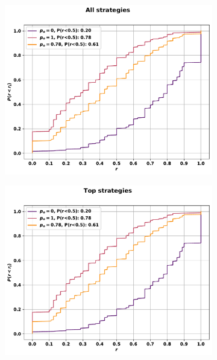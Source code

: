 \begin{figure}[!htbp]
    \begin{subfigure}{.45\textwidth}
    \includegraphics[width=\textwidth]{src/chapters/07/img/cfd_to_probability_all_strategies.pdf}
    \end{subfigure}\hfill
    \begin{subfigure}{.45\textwidth}
    \includegraphics[width=\textwidth]{src/chapters/07/img/cfd_to_probability_top_strategies.pdf}
    \end{subfigure}
    \begin{subfigure}{.45\textwidth}

\end{subfigure}
\end{figure}

